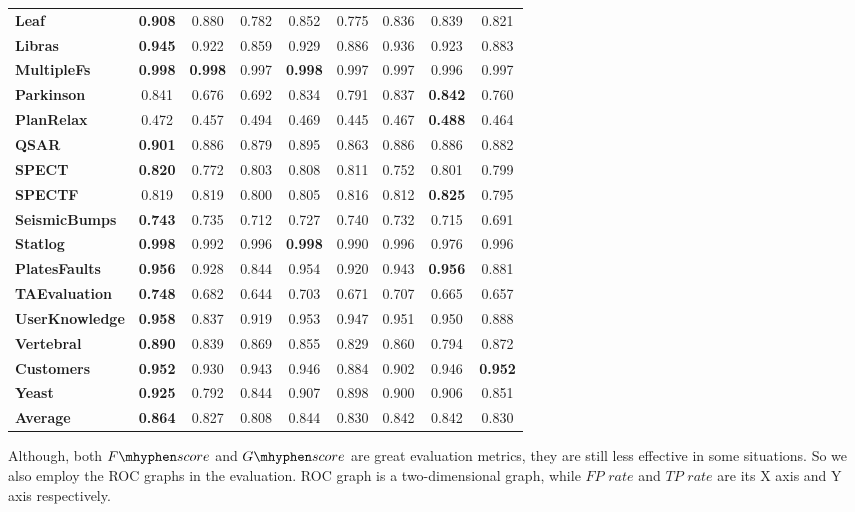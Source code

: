 \documentclass{iitthesis}
\newcommand\fscore{\mathop{F\mhyphen score}}
\newcommand\gscore{\mathop{G\mhyphen score}}
\begin{document}
\begin{table}[t]
\begin{center}
{\begin{tabular}{lcccccccc}
\textbf{Leaf} & \textbf{0.908} & 0.880 & 0.782 & 0.852 & 0.775 & 0.836 & 0.839 & 0.821 \\ 
\textbf{Libras} & \textbf{0.945} & 0.922 & 0.859 & 0.929 & 0.886 & 0.936 & 0.923 & 0.883 \\ 
\textbf{MultipleFs} & \textbf{0.998} & \textbf{0.998} & 0.997 & \textbf{0.998} & 0.997 & 0.997 & 0.996 & 0.997 \\ 
\textbf{Parkinson} & 0.841 & 0.676 & 0.692 & 0.834 & 0.791 & 0.837 & \textbf{0.842} & 0.760 \\ 
\textbf{PlanRelax} & 0.472 & 0.457 & 0.494 & 0.469 & 0.445 & 0.467 & \textbf{0.488} & 0.464 \\ 
\textbf{QSAR} & \textbf{0.901} & 0.886 & 0.879 & 0.895 & 0.863 & 0.886 & 0.886 & 0.882 \\ 
\textbf{SPECT} & \textbf{0.820} & 0.772 & 0.803 & 0.808 & 0.811 & 0.752 & 0.801 & 0.799 \\ 
\textbf{SPECTF} & 0.819 & 0.819 & 0.800 & 0.805 & 0.816 & 0.812 & \textbf{0.825} & 0.795 \\ 
\textbf{SeismicBumps} & \textbf{0.743} & 0.735 & 0.712 & 0.727 & 0.740 & 0.732 & 0.715 & 0.691 \\ 
\textbf{Statlog} & \textbf{0.998} & 0.992 & 0.996 & \textbf{0.998} & 0.990 & 0.996 & 0.976 & 0.996 \\ 
\textbf{PlatesFaults} & \textbf{0.956} & 0.928 & 0.844 & 0.954 & 0.920 & 0.943 & \textbf{0.956} & 0.881 \\ 
\textbf{TAEvaluation} & \textbf{0.748} & 0.682 & 0.644 & 0.703 & 0.671 & 0.707 & 0.665 & 0.657 \\ 
\textbf{UserKnowledge} & \textbf{0.958} & 0.837 & 0.919 & 0.953 & 0.947 & 0.951 & 0.950 & 0.888 \\ 
\textbf{Vertebral} & \textbf{0.890} & 0.839 & 0.869 & 0.855 & 0.829 & 0.860 & 0.794 & 0.872 \\ 
\textbf{Customers} & \textbf{0.952} & 0.930 & 0.943 & 0.946 & 0.884 & 0.902 & 0.946 & \textbf{0.952} \\ 
\textbf{Yeast} & \textbf{0.925} & 0.792 & 0.844 & 0.907 & 0.898 & 0.900 & 0.906 & 0.851 \\
\textbf{Average} & \textbf{0.864} & 0.827 & 0.808 & 0.844 & 0.830 & 0.842 & 0.842 & 0.830 \\
\hline
\end{tabular}
}
\end{center}
\label{tab: results_real_data_per_file}
\end{table} 

Although, both $\fscore$ and $\gscore$ are great evaluation metrics, they are still less effective in some situations. So we also employ the ROC graphs \cite{fawcett2004roc}\cite{fawcett2006introduction}\cite{mohri2005confidence} in the evaluation. ROC graph is a two-dimensional graph, while $FP$ $rate$ and $TP$ $rate$ are its X axis and Y axis respectively. 
\end{document}

